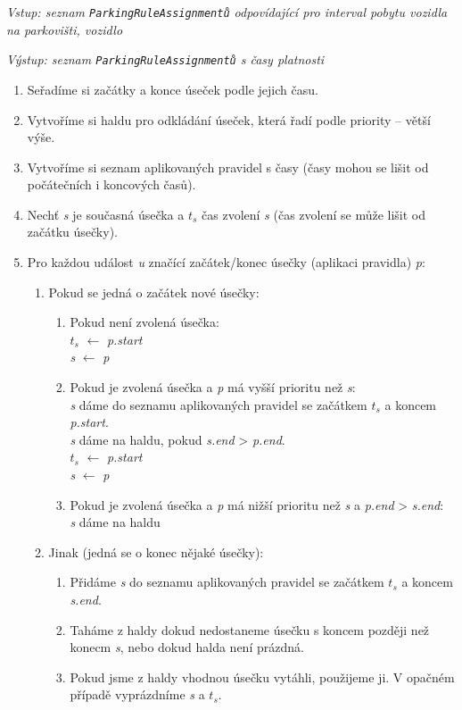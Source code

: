 \textit{Vstup: seznam \texttt{ParkingRuleAssignmentů} odpovídající pro interval pobytu vozidla na parkovišti, vozidlo}

\textit{Výstup: seznam \texttt{ParkingRuleAssignmentů} s časy platnosti}
\begin{enumerate}
  \item Seřadíme si začátky a konce úseček podle jejich času.
  \item Vytvoříme si haldu pro odkládání úseček, která řadí podle priority -- větší výše.
  \item Vytvoříme si seznam aplikovaných pravidel s časy (časy mohou se lišit od počátečních i koncových časů).
  \item Nechť \textit{s} je současná úsečka a \textit{$t_s$} čas zvolení \textit{s} (čas zvolení se může lišit od začátku úsečky).
  \item Pro každou událost \textit{u} značící začátek/konec úsečky (aplikaci pravidla) \textit{p}:
  \begin{enumerate}
    \item Pokud se jedná o začátek nové úsečky:
    \begin{enumerate}
      \item Pokud není zvolená úsečka:\\
            \textit{$t_s$} $\leftarrow$ \textit{p.start}\\
            \textit{s} $\leftarrow$ \textit{p}
      \item Pokud je zvolená úsečka a \textit{p} má vyšší prioritu než \textit{s}:\\
            \textit{s} dáme do seznamu aplikovaných pravidel se začátkem \textit{$t_s$} a koncem \textit{p.start}.\\
            \textit{s} dáme na haldu, pokud \textit{s.end} > \textit{p.end}.\\
            \textit{$t_s$} $\leftarrow$ \textit{p.start}\\
            \textit{s} $\leftarrow$ \textit{p}
      \item Pokud je zvolená úsečka a \textit{p} má nižší prioritu než \textit{s} a \textit{p.end} > \textit{s.end}:\\
            \textit{s} dáme na haldu
    \end{enumerate}
    \item Jinak (jedná se o konec nějaké úsečky):
    \begin{enumerate}
      \item Přidáme \textit{s} do seznamu aplikovaných pravidel se začátkem \textit{$t_s$} a koncem \textit{s.end}.
      \item Taháme z haldy dokud nedostaneme úsečku s koncem později než konecm \textit{s}, nebo dokud halda není prázdná.
      \item Pokud jsme z haldy vhodnou úsečku vytáhli, použijeme ji. V opačném případě vyprázdníme \textit{s} a \textit{$t_s$}.
    \end{enumerate}
  \end{enumerate}
\end{enumerate}

